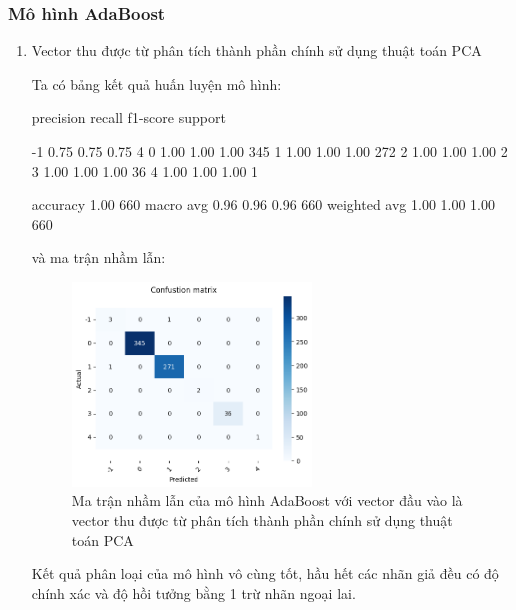 \subsubsection{Mô hình AdaBoost}

\begin{enumerate}[label=(\alph*)]
    \item Vector thu được từ phân tích thành phần chính sử dụng thuật toán PCA 
    
    Ta có bảng kết quả huấn luyện mô hình:

    \begin{python}
        precision    recall  f1-score   support

        -1       0.75      0.75      0.75         4
         0       1.00      1.00      1.00       345
         1       1.00      1.00      1.00       272
         2       1.00      1.00      1.00         2
         3       1.00      1.00      1.00        36
         4       1.00      1.00      1.00         1

  accuracy                           1.00       660
 macro avg       0.96      0.96      0.96       660
weighted avg       1.00      1.00      1.00       660
    \end{python}

    và ma trận nhầm lẫn:

    \begin{figure}[H]
        \centering
        \includegraphics[width=0.6\textwidth]{figures/Thanh/Data_Analysis/Non_null_confusion_matrix_AdaBoost_PCA_features.png}
        \caption{ Ma trận nhầm lẫn của mô hình AdaBoost với vector đầu vào là vector thu được từ
        phân tích thành phần chính sử dụng thuật toán PCA}
        \label{fig:Non_null_confusion_matrix_AdaBoost_PCA_features}
    \end{figure}

    Kết quả phân loại của mô hình vô cùng tốt, hầu hết các nhãn giả đều có độ chính xác và độ hồi tưởng bằng 1 trừ nhãn ngoại lai.


\end{enumerate}

